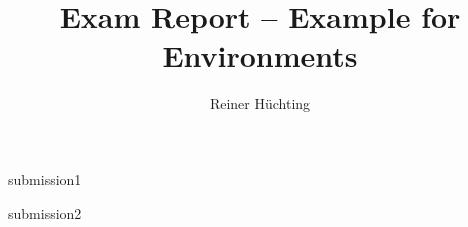 \documentclass[a4paper]{scrartcl}
\begin{document}
    \title{Exam Report -- Example for Environments}
    \author{Reiner Hüchting}

    \maketitle

    \begin{examreport}[submissions]
        \begin{submissionreport}{submission1}
        \end{submissionreport}
        \begin{submissionreport}{submission2}
        \end{submissionreport}
    \end{examreport}
\end{document}
